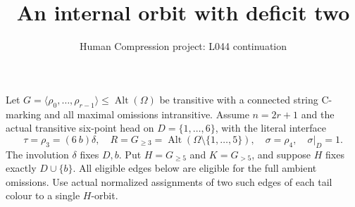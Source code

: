 \documentclass[11pt,a4paper]{article}
\title{An internal orbit with deficit two}
\author{Human Compression project: L044 continuation}
\date{}
\newcommand{\gen}[1]{\langle#1\rangle}
\newcommand{\Alt}{\operatorname{Alt}}
\begin{document}
\maketitle
Let $G=\gen{\rho_0,\ldots,\rho_{r-1}}\le\Alt(\Omega)$
be transitive with a connected string C-marking and all
maximal omissions intransitive. Assume $n=2r+1$ and
the actual transitive six-point head on $D=\{1,\ldots,6\}$,
with the literal interface
\[
 \tau=\rho_3=(6\ b)\delta,\quad
 R=G_{\ge3}=\Alt(\Omega\setminus\{1,\ldots,5\}),\quad
 \sigma=\rho_4,\quad \sigma|_D=1.
\]
The involution $\delta$ fixes $D,b$. Put $H=G_{\ge5}$
and $K=G_{>5}$, and suppose $H$ fixes exactly $D\cup\{b\}$.
All eligible edges below are eligible for the full ambient
omissions. Use actual normalized assignments of two such
edges of each tail colour to a single $H$-orbit.
\end{document}
